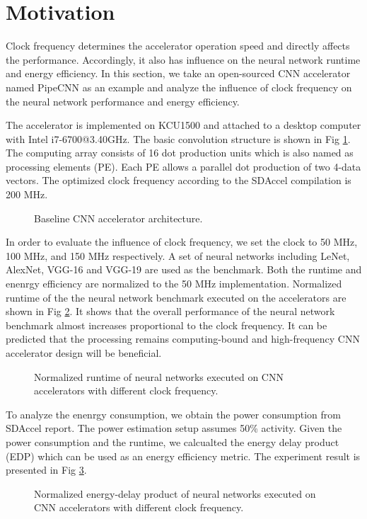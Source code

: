 \section{Motivation} \label{sec:motivation}
Clock frequency determines the accelerator operation speed 
and directly affects the performance. Accordingly, it also has influence on the 
neural network runtime and energy efficiency. In this section, we take 
an open-sourced CNN accelerator named PipeCNN \cite{pipecnn_2} as an example and analyze the 
influence of clock frequency on the neural network performance and energy efficiency.

The accelerator is implemented on KCU1500 and attached to a desktop computer with 
Intel i7-6700@3.40GHz. The basic convolution structure is shown in Fig \ref{fig:cnn-arch}. 
The computing array consists of 16 dot production units which is also named as 
processing elements (PE). Each PE allows a parallel dot production of two 4-data vectors.
The optimized clock frequency according to the SDAccel compilation 
is 200 MHz. 

\begin{figure}
    \caption{Baseline CNN accelerator architecture.}
\label{fig:cnn-arch}
\vspace{-1em}
\end{figure}


In order to evaluate the influence of clock 
frequency, we set the clock to 50 MHz, 100 MHz, and 150 MHz respectively.
A set of neural networks including LeNet, AlexNet, VGG-16 and VGG-19 are used as the benchmark.
Both the runtime and enenrgy efficiency are normalized to the 50 MHz implementation.
Normalized runtime of the the neural network benchmark executed on the accelerators are 
shown in Fig \ref{fig:computing-bound}. It shows that the 
overall performance of the neural network benchmark
almost increases proportional to the clock frequency. 
It can be predicted that the processing remains 
computing-bound and high-frequency CNN accelerator 
design will be beneficial.

\begin{figure}
    \caption{Normalized runtime of neural networks executed on CNN accelerators with different clock frequency.}
\label{fig:computing-bound}
\vspace{-1em}
\end{figure}

To analyze the enenrgy consumption, we obtain the power consumption from SDAccel report. 
The power estimation setup assumes 50\% activity. Given the power consumption and the runtime, 
we calcualted the energy delay product (EDP) which can be used as an energy efficiency metric.
The experiment result is presented in Fig \ref{fig:edp}.
\begin{figure}
	\vspace{-1em}
    \caption{Normalized energy-delay product of neural networks executed on CNN accelerators with different clock frequency.}
\label{fig:edp}
\vspace{-1em}
\end{figure}

